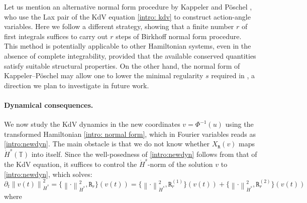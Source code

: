 \documentclass[a4paper,10pt,reqno]{article}
\theoremstyle{definition}
\theoremstyle{plain}
\theoremstyle{plain}
\theoremstyle{definition}
\theoremstyle{plain}
\theoremstyle{plain}
\theoremstyle{plain}
\theoremstyle{definition}
\theoremstyle{definition}
\newcommand{\norm}[1]{\left\lVert #1 \right\rVert}
\def \pa{{\partial}}
\def \T{\mathbb{T}}
\begin{document}
Let us mention an alternative normal form procedure by Kappeler and P\"oschel \cite{kappeler}, who use the Lax pair of the KdV equation \eqref{intro: kdv} to construct action-angle variables. 
Here we follow a different strategy, showing that a finite number $r$ of first integrals suffices to carry out $r$ steps of Birkhoff normal form procedure. 
This method is potentially applicable to other Hamiltonian systems, even in the absence of complete integrability, provided that the available conserved quantities satisfy suitable structural properties. On the other hand, the normal form of Kappeler–P\"oschel may allow one to lower the minimal regularity $s$ required in , a direction we plan to investigate in future work. 


\paragraph{Dynamical consequences.} We now study the KdV dynamics in the new coordinates $v=\Phi^{-1} (u)$ using the transformed Hamiltonian \eqref{intro: normal form}, which in Fourier variables reads as \eqref{intro:newdyn}. The main obstacle is that we do not know whether $X_{\mathtt{R}}(v)$ maps $\dot{H}^s(\T)$ into itself. Since the well-posedness of \eqref{intro:newdyn} follows from that of the KdV equation, it suffices to control the $\dot{H}^s$-norm of the solution $v$ to \eqref{intro:newdyn}, which solves:
\begin{equation}\label{intro:norm_v}
    \pa_t \norm{v(t)}_{\dot{H}^s}^2 = \{ \norm{\cdot}_{\dot{H}^s}^2, \mathtt{R}_r \} (v(t))=  \{ \norm{\cdot}_{\dot{H}^s}^2, \mathtt{R}_r^{(1)} \} (v(t)) + \{ \norm{\cdot}_{\dot{H}^s}^2, \mathtt{R}_r^{(2)} \} (v(t)) 
\end{equation}
where
\end{document}
